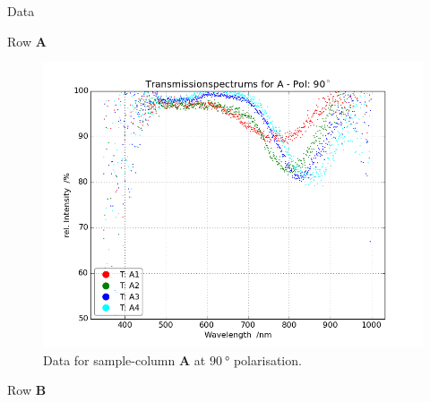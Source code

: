 \begin{appendix}
\begin{chapter}{Data}
\begin{section}{Row \textbf{A}}
\begin{figure}[ht!]
\begin{minipage}{.92\textwidth}
          \includegraphics[width=\textwidth]{Figures/TransspecRAW_APol90.png}
          \caption{Data for sample-column \textbf{A} at $\SI{90}{\degree}$
              polarisation.}
          \label{fig:TransspecRAW_APol90}
        \end{minipage}
      \end{figure}
      
    \end{section}
    
    
    
    \newpage
    \begin{section}{Row \textbf{B}}
      \label{Appendix:DataB}
      

\end{section}
\end{chapter}
\end{appendix}
